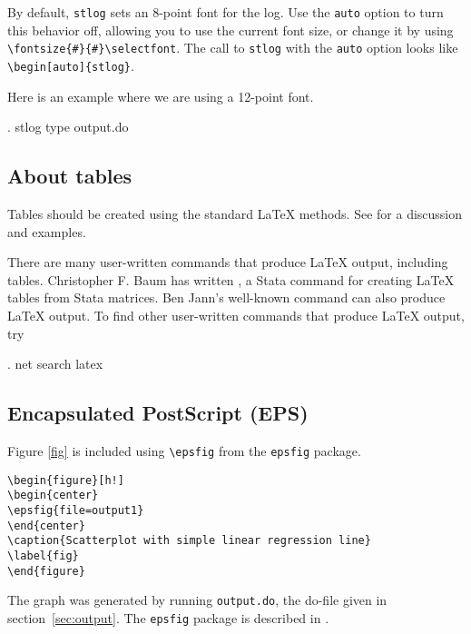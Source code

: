 By default, \texttt{stlog} sets an 8-point font for the log.  Use the
\texttt{auto} option to turn this behavior off, allowing you to use the
current font size, or change it by using\\ \verb+\fontsize{#}{#}\selectfont+.
The call to \texttt{stlog} with the \texttt{auto} option looks like
\verb+\begin[auto]{stlog}+.

Here is an example where we are using a 12-point font.

{\fontsize{12}{13}\selectfont
\begin{stlog}[auto]
. stlog type output.do
\end{stlog}
}

\subsection{About tables}

Tables should be created using the standard \LaTeX{} methods.  See
\citet{latexbook} for a discussion and examples.

There are many user-written commands that produce \LaTeX{} output, including
tables.  Christopher F. Baum has written , a Stata command for
creating \LaTeX{} tables from Stata matrices.  Ben Jann's well-known
 command can also produce \LaTeX{} output.  To find other
user-written commands that produce \LaTeX{} output, try

\begin{stlog}
. net search latex
\end{stlog}


\subsection{Encapsulated PostScript (EPS)}

Figure \ref{fig} is included using \verb+\epsfig+ from the \texttt{epsfig}
package.

\begin{stverbatim}
\begin{verbatim}
\begin{figure}[h!]
\begin{center}
\epsfig{file=output1}
\end{center}
\caption{Scatterplot with simple linear regression line}
\label{fig}
\end{figure}
\end{verbatim}
\end{stverbatim}

\noindent
The graph was generated by running \texttt{output.do}, the
do-file given in section~\ref{sec:output}.  The \texttt{epsfig} package is
described in \citet*{latexcompanion}.

